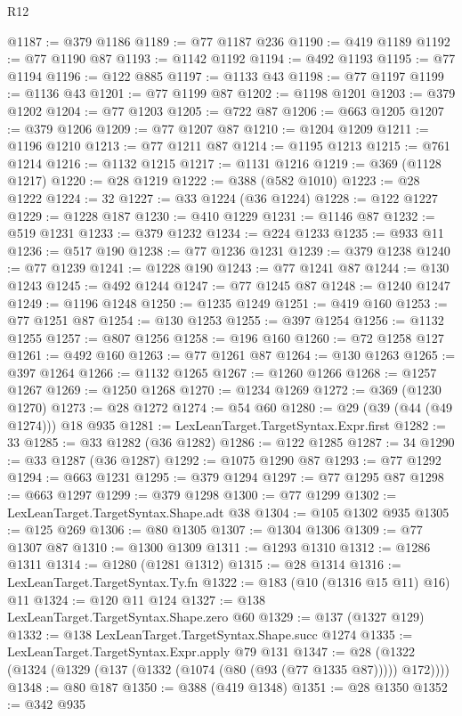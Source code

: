 \begin{lexlean}{R12}
\begin{coremodule}
@1187 := @379 @1186
@1189 := @77 @1187 @236
@1190 := @419 @1189
@1192 := @77 @1190 @87
@1193 := @1142 @1192
@1194 := @492 @1193
@1195 := @77 @1194
@1196 := @122 @885
@1197 := @1133 @43
@1198 := @77 @1197
@1199 := @1136 @43
@1201 := @77 @1199 @87
@1202 := @1198 @1201
@1203 := @379 @1202
@1204 := @77 @1203
@1205 := @722 @87
@1206 := @663 @1205
@1207 := @379 @1206
@1209 := @77 @1207 @87
@1210 := @1204 @1209
@1211 := @1196 @1210
@1213 := @77 @1211 @87
@1214 := @1195 @1213
@1215 := @761 @1214
@1216 := @1132 @1215
@1217 := @1131 @1216
@1219 := @369 (@1128 @1217)
@1220 := @28 @1219
@1222 := @388 (@582 @1010)
@1223 := @28 @1222
@1224 := 32
@1227 := @33 @1224 (@36 @1224)
@1228 := @122 @1227
@1229 := @1228 @187
@1230 := @410 @1229
@1231 := @1146 @87
@1232 := @519 @1231
@1233 := @379 @1232
@1234 := @224 @1233
@1235 := @933 @11
@1236 := @517 @190
@1238 := @77 @1236 @1231
@1239 := @379 @1238
@1240 := @77 @1239
@1241 := @1228 @190
@1243 := @77 @1241 @87
@1244 := @130 @1243
@1245 := @492 @1244
@1247 := @77 @1245 @87
@1248 := @1240 @1247
@1249 := @1196 @1248
@1250 := @1235 @1249
@1251 := @419 @160
@1253 := @77 @1251 @87
@1254 := @130 @1253
@1255 := @397 @1254
@1256 := @1132 @1255
@1257 := @807 @1256
@1258 := @196 @160
@1260 := @72 @1258 @127
@1261 := @492 @160
@1263 := @77 @1261 @87
@1264 := @130 @1263
@1265 := @397 @1264
@1266 := @1132 @1265
@1267 := @1260 @1266
@1268 := @1257 @1267
@1269 := @1250 @1268
@1270 := @1234 @1269
@1272 := @369 (@1230 @1270)
@1273 := @28 @1272
@1274 := @54 @60
@1280 := @29 (@39 (@44 (@49 @1274))) @18 @935
@1281 := LexLeanTarget.TargetSyntax.Expr.first
@1282 := 33
@1285 := @33 @1282 (@36 @1282)
@1286 := @122 @1285
@1287 := 34
@1290 := @33 @1287 (@36 @1287)
@1292 := @1075 @1290 @87
@1293 := @77 @1292
@1294 := @663 @1231
@1295 := @379 @1294
@1297 := @77 @1295 @87
@1298 := @663 @1297
@1299 := @379 @1298
@1300 := @77 @1299
@1302 := LexLeanTarget.TargetSyntax.Shape.adt @38
@1304 := @105 @1302 @935
@1305 := @125 @269
@1306 := @80 @1305
@1307 := @1304 @1306
@1309 := @77 @1307 @87
@1310 := @1300 @1309
@1311 := @1293 @1310
@1312 := @1286 @1311
@1314 := @1280 (@1281 @1312)
@1315 := @28 @1314
@1316 := LexLeanTarget.TargetSyntax.Ty.fn
@1322 := @183 (@10 (@1316 @15 @11) @16) @11
@1324 := @120 @11 @124
@1327 := @138 LexLeanTarget.TargetSyntax.Shape.zero @60
@1329 := @137 (@1327 @129)
@1332 := @138 LexLeanTarget.TargetSyntax.Shape.succ @1274
@1335 := LexLeanTarget.TargetSyntax.Expr.apply @79 @131
@1347 := @28 (@1322 (@1324 (@1329 (@137 (@1332 (@1074 (@80 (@93 (@77 @1335 @87))))) @172))))
@1348 := @80 @187
@1350 := @388 (@419 @1348)
@1351 := @28 @1350
@1352 := @342 @935

\end{coremodule}
\end{lexlean}
